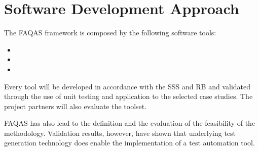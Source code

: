 \section{Software Development Approach}

The FAQAS framework is composed by the following software tools:
\begin{itemize}
  \item \MASS
  \item \DAMA
  \item \SEMUS
\end{itemize}

Every tool will be developed in accordance with the SSS and RB and validated through the use of unit testing and application to the selected case studies.
The project partners will also evaluate the toolset.

FAQAS has also lead to the definition and the evaluation of the feasibility of the \DAMTE methodology. Validation results, however, have shown that underlying test generation technology does enable the implementation of a test automation tool.
